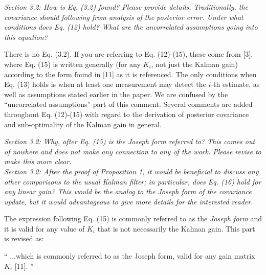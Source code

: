 \documentclass[11pt]{article}
\newenvironment{correction}{\begin{list}{}{\setlength{\leftmargin}{1cm}\setlength{\rightmargin}{1cm}}\vspace{\parsep}\item[]``}{''\end{list}}
\begin{document}
\begin{itemize}
\item {\itshape Section 3.2:
How is Eq. (3.2) found?  Please provide details.  Traditionally, the covariance should following from analysis of the posterior error.  Under what conditions does Eq. (12) hold?  What are the uncorrelated assumptions going into this equation?}

There is no Eq. (3.2). If you are referring to Eq. (12)-(15), these come from [3], where Eq. (15) is written generally (for any $K_i$, not just the Kalman gain) according to the form found in [11] as it is referenced. The only conditions when Eq. (13) holds is when at least one measurement may detect the $i$-th estimate, as well as assumptions stated earlier in the paper. We are confused by the ``uncorrelated assumptions'' part of this comment. Several comments are added throughout Eq. (12)-(15) with regard to the derivation of posterior covariance and sub-optimality of the Kalman gain in general.

%

\item {\itshape Section 3.2:
Why, after Eq. (15) is the Joseph form referred to?  This comes out of nowhere and does not make any connection to any of the work.  Please revise to make this more clear.
\\
Section 3.2:
After the proof of Proposition 1, it would be beneficial to discuss any other comparisons to the usual Kalman filter; in particular, does Eq. (16) hold for any linear gain?  This would be the analog to the Joseph form of the covariance update, but it would advantageous to give more details for the interested reader.
}

The expression following Eq. (15) is commonly referred to as the \textit{Joseph form} and it is valid for any value of $K_i$ that is not necessarily the Kalman gain. This part is revised as:

\begin{correction}
...which is commonly referred to as the Joseph form, valid for any gain matrix $K_i$ [11].
\end{correction}


\end{itemize}
\end{document}
